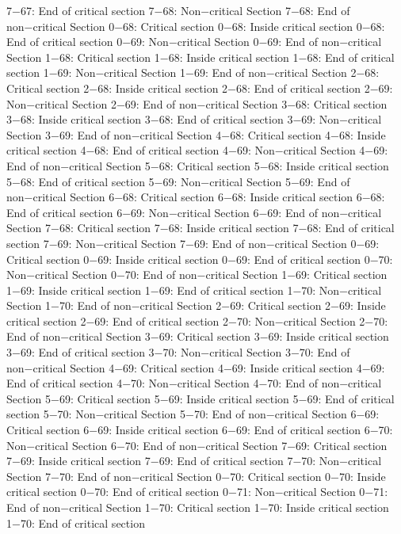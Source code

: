 7−67: End of critical section
7−68: Non−critical Section
7−68: End of non−critical Section
0−68: Critical section
0−68: Inside critical section
0−68: End of critical section
0−69: Non−critical Section
0−69: End of non−critical Section
1−68: Critical section
1−68: Inside critical section
1−68: End of critical section
1−69: Non−critical Section
1−69: End of non−critical Section
2−68: Critical section
2−68: Inside critical section
2−68: End of critical section
2−69: Non−critical Section
2−69: End of non−critical Section
3−68: Critical section
3−68: Inside critical section
3−68: End of critical section
3−69: Non−critical Section
3−69: End of non−critical Section
4−68: Critical section
4−68: Inside critical section
4−68: End of critical section
4−69: Non−critical Section
4−69: End of non−critical Section
5−68: Critical section
5−68: Inside critical section
5−68: End of critical section
5−69: Non−critical Section
5−69: End of non−critical Section
6−68: Critical section
6−68: Inside critical section
6−68: End of critical section
6−69: Non−critical Section
6−69: End of non−critical Section
7−68: Critical section
7−68: Inside critical section
7−68: End of critical section
7−69: Non−critical Section
7−69: End of non−critical Section
0−69: Critical section
0−69: Inside critical section
0−69: End of critical section
0−70: Non−critical Section
0−70: End of non−critical Section
1−69: Critical section
1−69: Inside critical section
1−69: End of critical section
1−70: Non−critical Section
1−70: End of non−critical Section
2−69: Critical section
2−69: Inside critical section
2−69: End of critical section
2−70: Non−critical Section
2−70: End of non−critical Section
3−69: Critical section
3−69: Inside critical section
3−69: End of critical section
3−70: Non−critical Section
3−70: End of non−critical Section
4−69: Critical section
4−69: Inside critical section
4−69: End of critical section
4−70: Non−critical Section
4−70: End of non−critical Section
5−69: Critical section
5−69: Inside critical section
5−69: End of critical section
5−70: Non−critical Section
5−70: End of non−critical Section
6−69: Critical section
6−69: Inside critical section
6−69: End of critical section
6−70: Non−critical Section
6−70: End of non−critical Section
7−69: Critical section
7−69: Inside critical section
7−69: End of critical section
7−70: Non−critical Section
7−70: End of non−critical Section
0−70: Critical section
0−70: Inside critical section
0−70: End of critical section
0−71: Non−critical Section
0−71: End of non−critical Section
1−70: Critical section
1−70: Inside critical section
1−70: End of critical section
